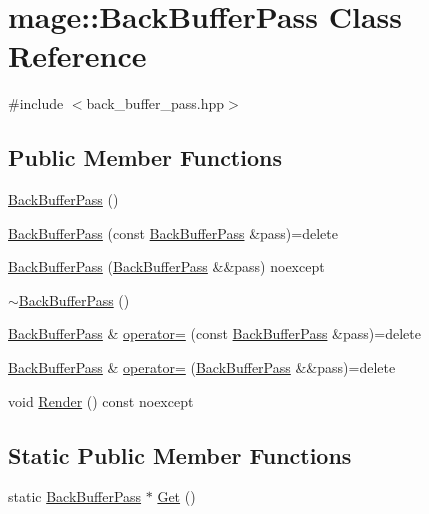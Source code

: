 \hypertarget{classmage_1_1_back_buffer_pass}{}\section{mage\+:\+:Back\+Buffer\+Pass Class Reference}
\label{classmage_1_1_back_buffer_pass}


{\ttfamily \#include $<$back\+\_\+buffer\+\_\+pass.\+hpp$>$}

\subsection*{Public Member Functions}
\begin{DoxyCompactItemize}
\item 
\hyperlink{classmage_1_1_back_buffer_pass_a46ce63d05208fc3dea43244713a6a280}{Back\+Buffer\+Pass} ()
\item 
\hyperlink{classmage_1_1_back_buffer_pass_a34cba227e301258e8fc9432124bc63cf}{Back\+Buffer\+Pass} (const \hyperlink{classmage_1_1_back_buffer_pass}{Back\+Buffer\+Pass} \&pass)=delete
\item 
\hyperlink{classmage_1_1_back_buffer_pass_a1ac5e5c055eecb094f449496c1475049}{Back\+Buffer\+Pass} (\hyperlink{classmage_1_1_back_buffer_pass}{Back\+Buffer\+Pass} \&\&pass) noexcept
\item 
\hyperlink{classmage_1_1_back_buffer_pass_a10ccd92ff4480261e9ecfc435f5d9ed3}{$\sim$\+Back\+Buffer\+Pass} ()
\item 
\hyperlink{classmage_1_1_back_buffer_pass}{Back\+Buffer\+Pass} \& \hyperlink{classmage_1_1_back_buffer_pass_a77c804349e3f96c5d9dbd16cb421fbb6}{operator=} (const \hyperlink{classmage_1_1_back_buffer_pass}{Back\+Buffer\+Pass} \&pass)=delete
\item 
\hyperlink{classmage_1_1_back_buffer_pass}{Back\+Buffer\+Pass} \& \hyperlink{classmage_1_1_back_buffer_pass_aeaba028d1e576630817059b3f5a833c4}{operator=} (\hyperlink{classmage_1_1_back_buffer_pass}{Back\+Buffer\+Pass} \&\&pass)=delete
\item 
void \hyperlink{classmage_1_1_back_buffer_pass_a6f0265c182a4b1ac2badd5df3fb11545}{Render} () const noexcept
\end{DoxyCompactItemize}
\subsection*{Static Public Member Functions}
\begin{DoxyCompactItemize}
\item 
static \hyperlink{classmage_1_1_back_buffer_pass}{Back\+Buffer\+Pass} $\ast$ \hyperlink{classmage_1_1_back_buffer_pass_ae925b441c80f2aa711fbba6d782e5f81}{Get} ()
\end{DoxyCompactItemize}
